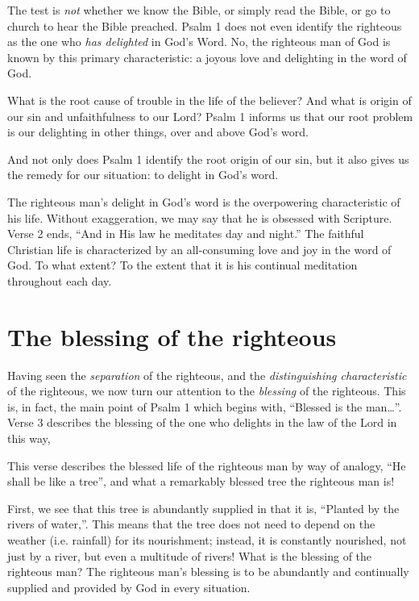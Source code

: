 The test is \emph{not} whether we know the Bible,
    or simply read the Bible,
    or go to church to hear the Bible preached.
Psalm 1 does not even identify the righteous as the one
    who \emph{has delighted} in God's Word.
No, the righteous man of God is known by this primary characteristic:
    a joyous love and delighting in the word of God.

What is the root cause of trouble in the life of the believer?
And what is origin of our sin and unfaithfulness to our Lord?
Psalm 1 informs us that our root problem is our delighting in other things,
    over and above God's word.

And not only does Psalm 1 identify the root origin of our sin,
    but it also gives us the remedy for our situation:
    to delight in God's word.

The righteous man's delight in God's word is the overpowering characteristic
    of his life.
Without exaggeration, we may say that he is obsessed with Scripture.
Verse 2 ends, ``And in His law he meditates day and night.''
The faithful Christian life is characterized by
    an all-consuming love and joy in the word of God.
To what extent?
To the extent that it is his continual meditation throughout each day.
    
\section{The blessing of the righteous}
Having seen the \emph{separation} of the righteous,
    and the \emph{distinguishing characteristic} of the righteous,
    we now turn our attention to the \emph{blessing} of the righteous.
This is, in fact, the main point of Psalm 1 which begins with, 
    ``Blessed is the man\ldots''.
Verse 3 describes the blessing of the one who delights in the law of the Lord 
    in this way,

This verse describes the blessed life of the righteous man by way of analogy,
    ``He shall be like a tree'',
    and what a remarkably blessed tree the righteous man is!

First, we see that this tree is abundantly supplied
    in that it is, ``Planted by the rivers of water,''.
This means that the tree does not need to depend on the weather (i.e. rainfall)
    for its nourishment;
    instead, it is constantly nourished,
    not just by a river,
    but even a multitude of rivers!
What is the blessing of the righteous man?
The righteous man's blessing is to be abundantly and continually supplied 
    and provided by God in every situation.

